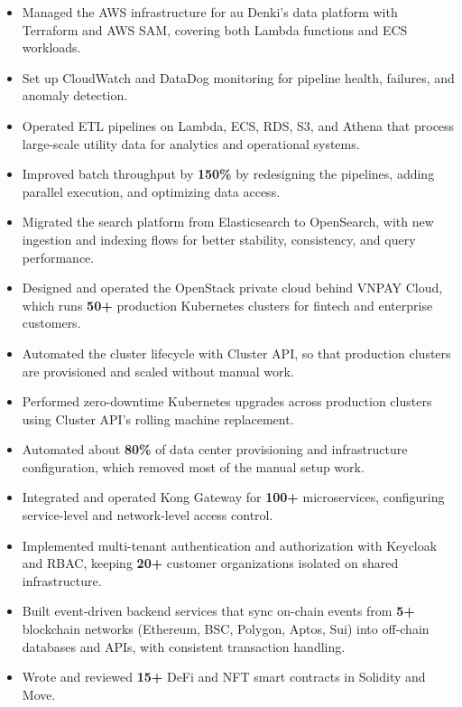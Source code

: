 \begin{itemize}
    \item Managed the AWS infrastructure for au Denki's data platform with Terraform and AWS SAM, covering both Lambda functions and ECS workloads. %
    \item Set up CloudWatch and DataDog monitoring for pipeline health, failures, and anomaly detection. %
    \item Operated ETL pipelines on Lambda, ECS, RDS, S3, and Athena that process large-scale utility data for analytics and operational systems. %
    \item Improved batch throughput by \textbf{150\%} by redesigning the pipelines, adding parallel execution, and optimizing data access. %
    \item Migrated the search platform from Elasticsearch to OpenSearch, with new ingestion and indexing flows for better stability, consistency, and query performance. %
\end{itemize}

\begin{itemize}
    \item Designed and operated the OpenStack private cloud behind VNPAY Cloud, which runs \textbf{50+} production Kubernetes clusters for fintech and enterprise customers. %
    \item Automated the cluster lifecycle with Cluster API, so that production clusters are provisioned and scaled without manual work. %
    \item Performed zero-downtime Kubernetes upgrades across production clusters using Cluster API's rolling machine replacement. %
    \item Automated about \textbf{80\%} of data center provisioning and infrastructure configuration, which removed most of the manual setup work. %
    \item Integrated and operated Kong Gateway for \textbf{100+} microservices, configuring service-level and network-level access control. %
    \item Implemented multi-tenant authentication and authorization with Keycloak and RBAC, keeping \textbf{20+} customer organizations isolated on shared infrastructure. %
\end{itemize}

\jobEsolLabs
\begin{itemize}
    \item Built event-driven backend services that sync on-chain events from \textbf{5+} blockchain networks (Ethereum, BSC, Polygon, Aptos, Sui) into off-chain databases and APIs, with consistent transaction handling. %
    \item Wrote and reviewed \textbf{15+} DeFi and NFT smart contracts in Solidity and Move. %
\end{itemize}


